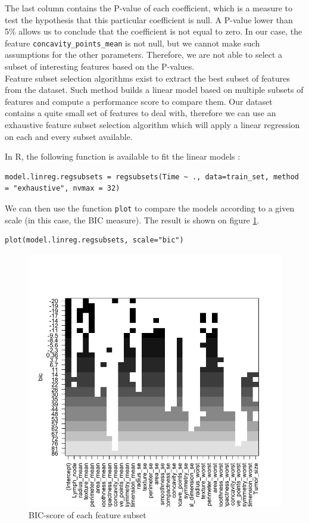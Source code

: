 \documentclass[]{report}
\begin{document}
The last column contains the P-value of each coefficient, which is a measure to test the hypothesis that this particular coefficient is null. A P-value lower than 5\% allows us to conclude that the coefficient is not equal to zero. In our case, the feature \texttt{concavity\_points\_mean} is not null, but we cannot make such assumptions for the other parameters. Therefore, we are not able to select a subset of interesting features based on the P-values. \\

Feature subset selection algorithms exist to extract the best subset of features from the dataset. Such method builds a linear model based on multiple subsets of features and compute a performance score to compare them. Our dataset contains a quite small set of features to deal with, therefore we can use an exhaustive feature subset selection algorithm which will apply a linear regression on each and every subset available.

In R, the following function is available to fit the linear models :
\begin{lstlisting}
model.linreg.regsubsets = regsubsets(Time ~ ., data=train_set, method = "exhaustive", nvmax = 32)
\end{lstlisting}

We can then use the function \texttt{plot} to compare the models according to a given scale (in this case, the BIC measure). The result is shown on figure \ref{fig:subset_bic}.
\begin{lstlisting}
plot(model.linreg.regsubsets, scale="bic")	
\end{lstlisting}

\begin{figure}[!h]
	\centering
	\includegraphics[width=0.8\linewidth]{Figures/subset_bic.png}
	\caption{BIC-score of each feature subset}
	\label{fig:subset_bic}
\end{figure}
\end{document}
